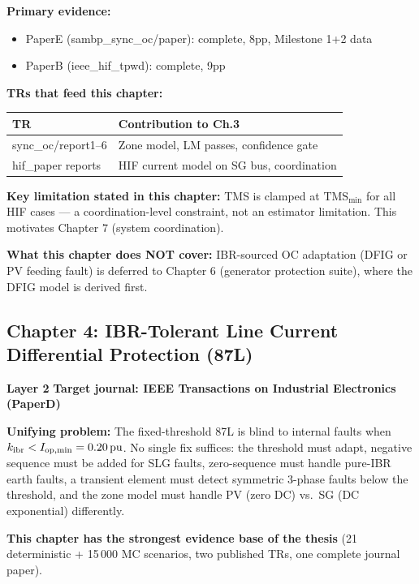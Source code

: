 \documentclass[11pt, a4paper]{article}
\newcommand{\chtag}[2]{\colorbox{#1}{\color{white}\textbf{\small #2}}}
\begin{document}
\textbf{Primary evidence:}
\begin{itemize}[nosep]
  \item PaperE (sambp\_sync\_oc/paper): complete, 8pp, Milestone 1+2 data
  \item PaperB (ieee\_hif\_tpwd): complete, 9pp
\end{itemize}

\textbf{TRs that feed this chapter:}
\begin{center}
\begin{tabular}{ll}
\toprule
TR & Contribution to Ch.3 \\
\midrule
sync\_oc/report1--6 & Zone model, LM passes, confidence gate \\
hif\_paper reports & HIF current model on SG bus, coordination \\
\bottomrule
\end{tabular}
\end{center}

\textbf{Key limitation stated in this chapter:} TMS is clamped at
$\text{TMS}_{\min}$ for all HIF cases — a coordination-level constraint, not
an estimator limitation.  This motivates Chapter 7 (system coordination).

\textbf{What this chapter does NOT cover:}
IBR-sourced OC adaptation (DFIG or PV feeding fault) is deferred to Chapter 6
(generator protection suite), where the DFIG model is derived first.

\subsection{Chapter 4: IBR-Tolerant Line Current Differential Protection (87L)}

\chtag{C3col}{Layer 2} \quad \textbf{Target journal: IEEE Transactions on Industrial Electronics (PaperD)}

\textbf{Unifying problem:} The fixed-threshold 87L is blind to internal faults when
$k_{\rm ibr} < I_{\rm op,min} = 0.20\,\text{pu}$.  No single fix suffices:
the threshold must adapt, negative sequence must be added for SLG faults,
zero-sequence must handle pure-IBR earth faults, a transient element must detect
symmetric 3-phase faults below the threshold, and the zone model must handle PV
(zero DC) vs.\ SG (DC exponential) differently.

\textbf{This chapter has the strongest evidence base of the thesis}
(21 deterministic + 15\,000 MC scenarios, two published TRs, one complete journal paper).
\end{document}
